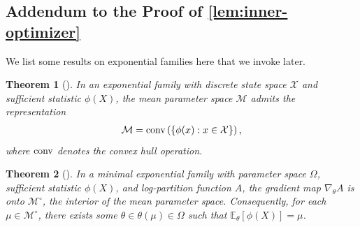 \documentclass[11pt]{amsart}
\numberwithin{equation}{section}
\numberwithin{equation}{section}
\newcommand{\1}{\mathbbm{1}}
\newcommand{\E}{\mathbb{E}}
\newtheorem{theorem}{Theorem}[section]
\theoremstyle{definition}
\begin{document}
\begin{appendices}
\section{\texorpdfstring{Addendum to the Proof of \cref{lem:inner-optimizer}}{Addendum to the Proof of Lemma \ref{lem:inner-optimizer}}} \label{app:lagrange-multipliers-addendum}

We list some results on exponential families here that we invoke later.

\begin{theorem}[{\cite[Equation (3.28)]{wainwright2008graphical}}] \label{thm:exp-fam-mean-representation}
    In an exponential family with discrete state space $\mathcal X$ and sufficient statistic $\phi(X)$, the mean parameter space $\mathcal M$ admits the representation
    \begin{align*}
        \mathcal M = \textup{conv}\left(\{ \phi(x) : x \in \mathcal X \} \right),
    \end{align*}
    where $\textup{conv}$ denotes the convex hull operation.
\end{theorem}

\begin{theorem}[{\cite[Theorem 3.3]{wainwright2008graphical}}] \label{thm:exp-fam-mean-realization}
    In a minimal exponential family with parameter space $\Omega$, sufficient statistic $\phi(X)$, and log-partition function $A$, the gradient map $\nabla_\theta A$ is onto $\mathcal M^\circ$, the interior of the mean parameter space. Consequently, for each $\mu \in \mathcal M^\circ$, there exists some $\theta \in \theta(\mu) \in \Omega$ such that $\E_\theta[\phi(X)] = \mu$.
\end{theorem}


\end{appendices}
\end{document}
